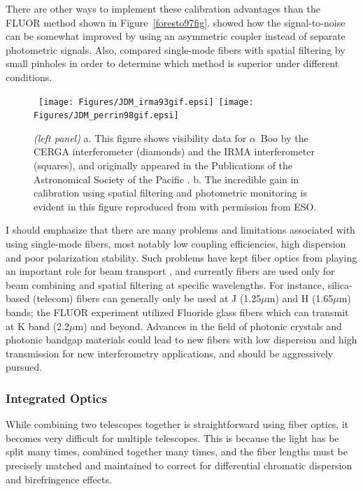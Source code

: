 \documentclass[12pt]{iopart}
\begin{document}
There are other ways to implement these calibration advantages than
the FLUOR method shown in Figure~\ref{foresto97fig}.
\citet{monnier2001} showed how the signal-to-noise can be somewhat
improved by using an asymmetric coupler instead of separate
photometric signals.  Also, \citet{keen2001} compared single-mode
fibers with spatial filtering by small pinholes in order to determine
which method is superior under different conditions. 

\begin{figure}[tbhp]
\begin{center}
\mbox{
\texttt{[image: Figures/JDM\_irma93gif.epsi]}
\texttt{[image: Figures/JDM\_perrin98gif.epsi]}}
\caption{\footnotesize {\em (left panel)}
  a. This figure shows visibility data for $\alpha$~Boo by the CERGA
  interferometer (diamonds) and the IRMA interferometer (squares), and
  originally appeared in the Publications of the Astronomical Society
  of the Pacific \citep[Copyright 1993, Astronomical Society
  of the Pacific;][reproduced with permission of the Editors]{dyck1993}.
  b. The incredible gain in calibration using spatial filtering and
  photometric monitoring is evident in this figure reproduced from
  \citet[][Figure 2a]{perrin1998} with permission from ESO.
\label{comparecal}}
\end{center}
\end{figure}

I should emphasize that there are many problems and limitations
associated with using single-mode fibers, most notably low coupling
efficiencies, high dispersion and poor polarization stability.  Such
problems have kept fiber optics from playing an important role for
beam transport \citep{simohamed1997}, and currently fibers are used
only for beam combining and spatial filtering at specific wavelengths.
For instance, silica-based (telecom) fibers can generally only be used
at J (1.25$\mu$m) and H (1.65$\mu$m) bands; the FLUOR experiment
utilized Fluoride glass fibers which can transmit at K band
(2.2$\mu$m) and beyond.  Advances in the field of
photonic crystals and photonic bandgap materials could lead to new
fibers with low dispersion and high transmission for new
interferometry applications, and should be aggressively pursued.

\subsubsection{Integrated Optics}
While combining two telescopes together is straightforward using fiber
optics, it becomes very difficult for multiple telescopes. This is
because the light has be split many times, combined together many
times, and the fiber lengths must be precisely matched and maintained
to correct for differential chromatic dispersion and birefringence
effects.
\end{document}

